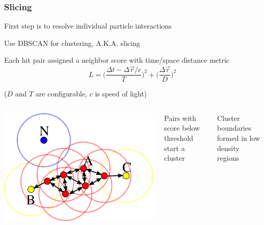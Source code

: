 \documentclass[10pt,professionalfonts,xcolor=table]{beamer}
\begin{document}
\begin{frame}

\frametitle{Slicing}

\bangon
\item First step is to resolve individual particle interactions
\gap
\item Use DBSCAN for clustering, A.K.A. slicing
\gap
\item Each hit pair assigned a neighbor score with time/space distance metric
\begin{equation*}
L = \bigg( \frac{\Delta t - \Delta \vec{r} / c }{T} \bigg)^2 +
     \bigg( \frac{\Delta \vec{r}}{D} \bigg)^2
\end{equation*}
\begin{center}
 ($D$ and $T$ are configurable, $c$ is speed of light)
\end{center}
\bangoff

\begin{columns}[c]

\centering

\includegraphics[width=\textwidth]{figures/figures/dbscan.png}

\bangon
\gap
\item Pairs with score below threshold start a cluster
\gap
\item Cluster boundaries formed in low density regions

\bangoff

\end{columns}

\end{frame}
\end{document}
